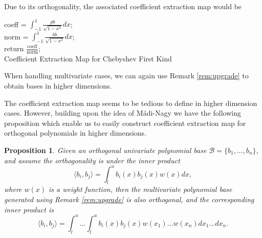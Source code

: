 \documentclass[12pt]{amsart}
\numberwithin{equation}{section}
\newtheorem{prop}[thm]{Proposition}
\theoremstyle{definition}
\numberwithin{thm}{section}
\begin{document}
Due to its orthogonality, the associated coefficient extraction map would be 

\begin{algorithm}[H]
     \SetAlgoLined
     coeff = $\int_{-1}^1 \frac{pb}{\sqrt{1-x^2}} dx$;\\
     norm = $\int_{-1}^1 \frac{bb}{\sqrt{1-x^2}} dx$;\\
     return $\frac{\text{coeff}}{\text{norm}}$;\\
     \caption{Coefficient Extraction Map for Chebyshev First Kind}
\end{algorithm}

When handling multivariate cases, we can again use Remark \ref{rem:upgrade} to obtain bases in higher dimensions.

The {coefficient extraction map} seems to be tedious to define in higher dimension cases.
However, building upon the idea of Mádi-Nagy we have the following proposition which enable us to easily 
construct {coefficient extraction map} for orthogonal polynomials in higher dimensions. \cite{M-Nagy2012}

\begin{prop}
     \label{prop:COOLPROP}
     Given an orthogonal univariate polynomial base $\mathcal{B} = \{b_1, ..., b_n\}$, and assume the orthogonality is under the inner product 
     \begin{equation*}
          \langle b_i, b_j \rangle = \int_l^u b_i(x)b_j(x)w(x) dx,
     \end{equation*}
     where $w(x)$ is a weight function, 
     then the multivariate polynomial base generated using Remark \ref{rem:upgrade} is also orthogonal, and the corresponding inner product is
     \begin{equation*}
          \langle b_i, b_j \rangle = \int_l^u...\int_l^u  b_i(x)b_j(x)w(x_1)...w(x_n) dx_1 ... dx_n.
     \end{equation*}
\end{prop}
\end{document}
